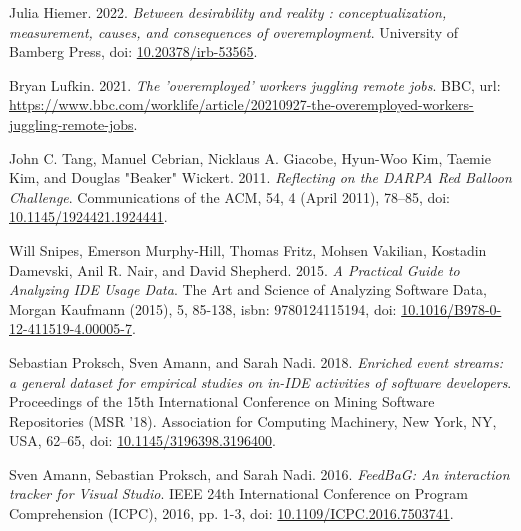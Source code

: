 \begin{thebibliography}{99}
 Julia Hiemer. 2022. \textit{Between desirability and reality : conceptualization, measurement, causes, and consequences of overemployment}. University of Bamberg Press, doi: \href{https://doi.org/10.20378/irb-53565}{10.20378/irb-53565}.

 Bryan Lufkin. 2021. \textit{The 'overemployed' workers juggling remote jobs}. BBC, url: \url{https://www.bbc.com/worklife/article/20210927-the-overemployed-workers-juggling-remote-jobs}.

 John C. Tang, Manuel Cebrian, Nicklaus A. Giacobe, Hyun-Woo Kim, Taemie Kim, and Douglas "Beaker" Wickert. 2011. \textit{Reflecting on the DARPA Red Balloon Challenge}. Communications of the ACM, 54, 4 (April 2011), 78–85, doi: \href{https://doi.org/10.1145/1924421.1924441}{10.1145/1924421.1924441}.

 Will Snipes, Emerson Murphy-Hill, Thomas Fritz, Mohsen Vakilian, Kostadin Damevski, Anil R. Nair, and David Shepherd. 2015. \textit{A Practical Guide to Analyzing IDE Usage Data}. The Art and Science of Analyzing Software Data, Morgan Kaufmann (2015), 5, 85-138, isbn: 9780124115194, doi: \href{https://doi.org/10.1016/B978-0-12-411519-4.00005-7}{10.1016/B978-0-12-411519-4.00005-7}.

 Sebastian Proksch, Sven Amann, and Sarah Nadi. 2018. \textit{Enriched event streams: a general dataset for empirical studies on in-IDE activities of software developers}. Proceedings of the 15th International Conference on Mining Software Repositories (MSR '18). Association for Computing Machinery, New York, NY, USA, 62–65, doi: \href{https://doi.org/10.1145/3196398.3196400}{10.1145/3196398.3196400}.

 Sven Amann, Sebastian Proksch, and Sarah Nadi. 2016. \textit{FeedBaG: An interaction tracker for Visual Studio}. IEEE 24th International Conference on Program Comprehension (ICPC), 2016, pp. 1-3, doi: \href{https://doi.org/10.1109/ICPC.2016.7503741}{10.1109/ICPC.2016.7503741}.

\end{thebibliography}
